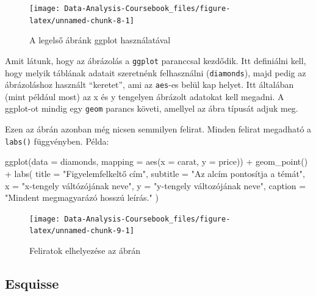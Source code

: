 \documentclass[
]{article}
\newenvironment{Shaded}{\begin{snugshade}}{\end{snugshade}}
\newcommand{\AttributeTok}[1]{\textcolor[rgb]{0.77,0.63,0.00}{#1}}
\newcommand{\FunctionTok}[1]{\textcolor[rgb]{0.00,0.00,0.00}{#1}}
\newcommand{\NormalTok}[1]{#1}
\newcommand{\SpecialCharTok}[1]{\textcolor[rgb]{0.00,0.00,0.00}{#1}}
\newcommand{\StringTok}[1]{\textcolor[rgb]{0.31,0.60,0.02}{#1}}
\begin{document}
\begin{figure}

{\centering \texttt{[image: Data-Analysis-Coursebook\_files/figure-latex/unnamed-chunk-8-1]} 

}

\caption{A legelső ábránk ggplot használatával}\label{fig:unnamed-chunk-8}
\end{figure}

Amit látunk, hogy az ábrázolás a \texttt{ggplot} paranccsal kezdődik. Itt definiálni kell, hogy melyik táblának adatait szeretnénk felhasználni (\texttt{diamonds}), majd pedig az ábrázoláshoz használt ``keretet'', ami az \texttt{aes}-es belül kap helyet. Itt általában (mint például most) az x és y tengelyen ábrázolt adatokat kell megadni. A ggplot-ot mindig egy \texttt{geom} parancs követi, amellyel az ábra típusát adjuk meg.

Ezen az ábrán azonban még nicsen semmilyen felirat. Minden felirat megadható a \texttt{labs()} függvényben. Példa:

\begin{Shaded}
\begin{Highlighting}[]
\FunctionTok{ggplot}\NormalTok{(}\AttributeTok{data =}\NormalTok{ diamonds, }\AttributeTok{mapping =} \FunctionTok{aes}\NormalTok{(}\AttributeTok{x =}\NormalTok{ carat, }\AttributeTok{y =}\NormalTok{ price)) }\SpecialCharTok{+}
  \FunctionTok{geom\_point}\NormalTok{() }\SpecialCharTok{+}
  \FunctionTok{labs}\NormalTok{(}
    \AttributeTok{title =} \StringTok{"Figyelemfelkeltő cím"}\NormalTok{,}
    \AttributeTok{subtitle =} \StringTok{"Az alcím pontosítja a témát"}\NormalTok{,}
    \AttributeTok{x =} \StringTok{"x{-}tengely váltózójának neve"}\NormalTok{,}
    \AttributeTok{y =} \StringTok{"y{-}tengely változójának neve"}\NormalTok{,}
    \AttributeTok{caption =} \StringTok{"Mindent megmagyarázó hosszú leírás."}
\NormalTok{  )}
\end{Highlighting}
\end{Shaded}

\begin{figure}

{\centering \texttt{[image: Data-Analysis-Coursebook\_files/figure-latex/unnamed-chunk-9-1]} 

}

\caption{Feliratok elhelyezése az ábrán}\label{fig:unnamed-chunk-9}
\end{figure}

\hypertarget{esquisse}{%
\subsection{Esquisse}\label{esquisse}}
\end{document}
